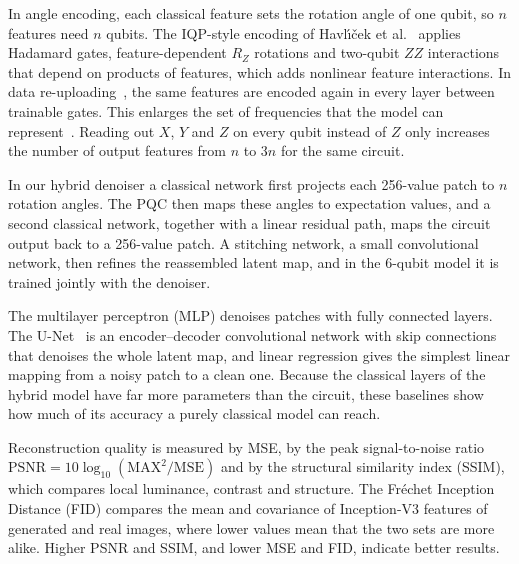 In angle encoding, each classical feature sets the rotation angle of one qubit, so $n$ features need $n$ qubits. The IQP-style encoding of Havl\'{\i}\v{c}ek et al.~\cite{havlicek} applies Hadamard gates, feature-dependent $R_Z$ rotations and two-qubit $ZZ$ interactions that depend on products of features, which adds nonlinear feature interactions. In data re-uploading~\cite{salinas}, the same features are encoded again in every layer between trainable gates. This enlarges the set of frequencies that the model can represent~\cite{schuld}. Reading out $X$, $Y$ and $Z$ on every qubit instead of $Z$ only increases the number of output features from $n$ to $3n$ for the same circuit.

In our hybrid denoiser a classical network first projects each 256-value patch to $n$ rotation angles. The PQC then maps these angles to expectation values, and a second classical network, together with a linear residual path, maps the circuit output back to a 256-value patch. A stitching network, a small convolutional network, then refines the reassembled latent map, and in the 6-qubit model it is trained jointly with the denoiser.

The multilayer perceptron (MLP) denoises patches with fully connected layers. The U-Net~\cite{unet} is an encoder--decoder convolutional network with skip connections that denoises the whole latent map, and linear regression gives the simplest linear mapping from a noisy patch to a clean one. Because the classical layers of the hybrid model have far more parameters than the circuit, these baselines show how much of its accuracy a purely classical model can reach.

Reconstruction quality is measured by MSE, by the peak signal-to-noise ratio $\mathrm{PSNR}=10\log_{10}(\mathrm{MAX}^2/\mathrm{MSE})$ and by the structural similarity index (SSIM), which compares local luminance, contrast and structure. The Fr\'echet Inception Distance (FID) compares the mean and covariance of Inception-V3 features of generated and real images, where lower values mean that the two sets are more alike. Higher PSNR and SSIM, and lower MSE and FID, indicate better results.
